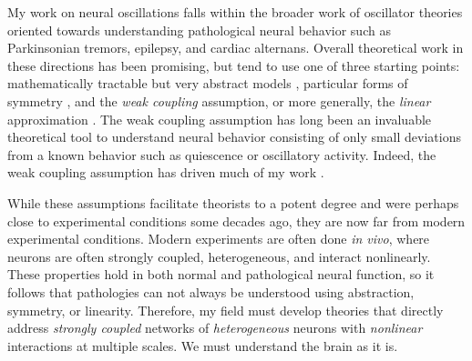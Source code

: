 \documentclass[a4paper,11pt]{article}
\begin{document}
% 
%


My work on neural oscillations falls within the broader work of oscillator theories oriented towards understanding pathological neural behavior such as Parkinsonian tremors, epilepsy, and cardiac alternans. Overall theoretical work in these directions has been promising, but tend to use one of three starting points: mathematically tractable but very abstract models \cite{ott2008low}, particular forms of symmetry \cite{golubitsky1986hopf}, and the \textit{weak coupling} assumption, or more generally, the \textit{linear} approximation \cite{ermentrout2002modeling}. The weak coupling assumption has long been an invaluable theoretical tool to understand neural behavior consisting of only small deviations from a known behavior such as quiescence or oscillatory activity. Indeed, the weak coupling assumption has driven much of my work \cite{park2016weakly,park2018multiple,park2018scalar}. 

While these assumptions facilitate theorists to a potent degree and were perhaps close to experimental conditions some decades ago, they are now far from modern experimental conditions. Modern experiments are often done \textit{in vivo}, where neurons are often strongly coupled, heterogeneous, and interact nonlinearly. These properties hold in both normal and pathological neural function, so it follows that pathologies can not always be understood using abstraction, symmetry, or linearity. Therefore, my field must develop theories that directly address \textit{strongly coupled} networks of \textit{heterogeneous} neurons with \textit{nonlinear} interactions at multiple scales. We must understand the brain as it is.
\end{document}
